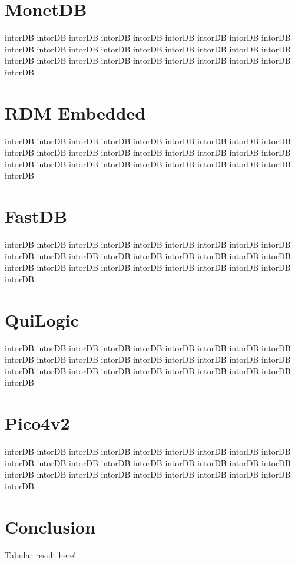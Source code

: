		\section{MonetDB}
		intorDB intorDB intorDB intorDB intorDB intorDB intorDB 
		intorDB intorDB intorDB intorDB intorDB intorDB intorDB 
		intorDB intorDB intorDB intorDB intorDB intorDB intorDB 
		intorDB intorDB intorDB intorDB intorDB intorDB intorDB 
		
		\section{RDM Embedded}
		intorDB intorDB intorDB intorDB intorDB intorDB intorDB 
		intorDB intorDB intorDB intorDB intorDB intorDB intorDB 
		intorDB intorDB intorDB intorDB intorDB intorDB intorDB 
		intorDB intorDB intorDB intorDB intorDB intorDB intorDB 
		
		\section{FastDB}
		intorDB intorDB intorDB intorDB intorDB intorDB intorDB 
		intorDB intorDB intorDB intorDB intorDB intorDB intorDB 
		intorDB intorDB intorDB intorDB intorDB intorDB intorDB 
		intorDB intorDB intorDB intorDB intorDB intorDB intorDB 
		
		\section{QuiLogic}
		intorDB intorDB intorDB intorDB intorDB intorDB intorDB 
		intorDB intorDB intorDB intorDB intorDB intorDB intorDB 
		intorDB intorDB intorDB intorDB intorDB intorDB intorDB 
		intorDB intorDB intorDB intorDB intorDB intorDB intorDB 
		
		\section{Pico4v2}
		intorDB intorDB intorDB intorDB intorDB intorDB intorDB 
		intorDB intorDB intorDB intorDB intorDB intorDB intorDB 
		intorDB intorDB intorDB intorDB intorDB intorDB intorDB 
		intorDB intorDB intorDB intorDB intorDB intorDB intorDB 
		
		\section{Conclusion}
		Tabular result here!